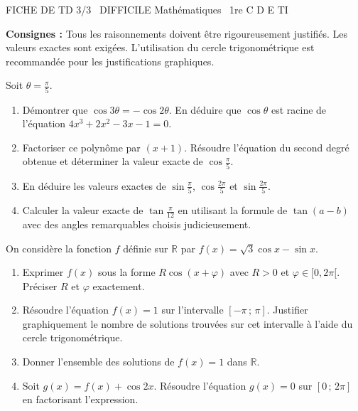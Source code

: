 \documentclass[11pt]{article}
\begin{document}
\begin{tcolorbox}[enhanced,colback=popink,colframe=popink,arc=10pt,boxrule=0pt,left=12pt,right=12pt,top=9pt,bottom=9pt]
{\color{white}\popxbold\small FICHE DE TD 3/3 \textbullet\ DIFFICILE \hfill Mathématiques \textbullet\ 1re C D E TI\par}
\end{tcolorbox}
\vspace{4pt}
\noindent\textbf{Consignes :} Tous les raisonnements doivent être rigoureusement justifiés. Les valeurs exactes sont exigées. L'utilisation du cercle trigonométrique est recommandée pour les justifications graphiques.

\begin{exercice}
Soit $\theta = \frac{\pi}{5}$.
\begin{enumerate}
    \item Démontrer que $\cos 3\theta = -\cos 2\theta$. En déduire que $\cos\theta$ est racine de l'équation $4x^3 + 2x^2 - 3x - 1 = 0$.
    \item Factoriser ce polynôme par $(x+1)$. Résoudre l'équation du second degré obtenue et déterminer la valeur exacte de $\cos\frac{\pi}{5}$.
    \item En déduire les valeurs exactes de $\sin\frac{\pi}{5}$, $\cos\frac{2\pi}{5}$ et $\sin\frac{2\pi}{5}$.
    \item Calculer la valeur exacte de $\tan\frac{\pi}{12}$ en utilisant la formule de $\tan(a-b)$ avec des angles remarquables choisis judicieusement.
\end{enumerate}
\end{exercice}

\begin{exercice}
On considère la fonction $f$ définie sur $\mathbb{R}$ par $f(x) = \sqrt{3}\cos x - \sin x$.
\begin{enumerate}
    \item Exprimer $f(x)$ sous la forme $R\cos(x+\varphi)$ avec $R>0$ et $\varphi \in [0, 2\pi[$. Préciser $R$ et $\varphi$ exactement.
    \item Résoudre l'équation $f(x) = 1$ sur l'intervalle $[-\pi\,;\, \pi]$. Justifier graphiquement le nombre de solutions trouvées sur cet intervalle à l'aide du cercle trigonométrique.
    \item Donner l'ensemble des solutions de $f(x) = 1$ dans $\mathbb{R}$.
    \item Soit $g(x) = f(x) + \cos 2x$. Résoudre l'équation $g(x) = 0$ sur $[0\,;\, 2\pi]$ en factorisant l'expression.
\end{enumerate}
\end{exercice}
\end{document}
